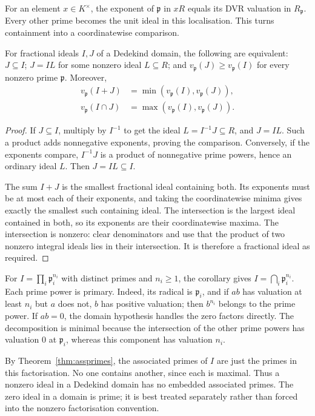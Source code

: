 For an element $x\in K^\times$, the exponent of $\mathfrak p$ in $xR$ equals its DVR valuation in $R_{\mathfrak p}$. Every other prime becomes the unit ideal in this localisation. This turns containment into a coordinatewise comparison.

\begin{corollary}\label{cor:contain}
For fractional ideals $I,J$ of a Dedekind domain, the following are equivalent: $J\subseteq I$; $J=IL$ for some nonzero ideal $L\subseteq R$; and $v_{\mathfrak p}(J)\ge v_{\mathfrak p}(I)$ for every nonzero prime $\mathfrak p$. Moreover,
\[
\begin{split}
 v_{\mathfrak p}(I+J)&=\min(v_{\mathfrak p}(I),v_{\mathfrak p}(J)),\\
 v_{\mathfrak p}(I\cap J)&=\max(v_{\mathfrak p}(I),v_{\mathfrak p}(J)).
\end{split}
\]
\end{corollary}

\begin{proof}
If $J\subseteq I$, multiply by $I^{-1}$ to get the ideal $L=I^{-1}J\subseteq R$, and $J=IL$. Such a product adds nonnegative exponents, proving the comparison. Conversely, if the exponents compare, $I^{-1}J$ is a product of nonnegative prime powers, hence an ordinary ideal $L$. Then $J=IL\subseteq I$.

The sum $I+J$ is the smallest fractional ideal containing both. Its exponents must be at most each of their exponents, and taking the coordinatewise minima gives exactly the smallest such containing ideal. The intersection is the largest ideal contained in both, so its exponents are their coordinatewise maxima. The intersection is nonzero: clear denominators and use that the product of two nonzero integral ideals lies in their intersection. It is therefore a fractional ideal as required.
\end{proof}

For $I=\prod_i\mathfrak p_i^{n_i}$ with distinct primes and $n_i\ge1$, the corollary gives $I=\bigcap_i\mathfrak p_i^{n_i}$. Each prime power is primary. Indeed, its radical is $\mathfrak p_i$, and if $ab$ has valuation at least $n_i$ but $a$ does not, $b$ has positive valuation; then $b^{n_i}$ belongs to the prime power. If $ab=0$, the domain hypothesis handles the zero factors directly. The decomposition is minimal because the intersection of the other prime powers has valuation $0$ at $\mathfrak p_i$, whereas this component has valuation $n_i$.

By Theorem~\ref{thm:assprimes}, the associated primes of $I$ are just the primes in this factorisation. No one contains another, since each is maximal. Thus a nonzero ideal in a Dedekind domain has no embedded associated primes. The zero ideal in a domain is prime; it is best treated separately rather than forced into the nonzero factorisation convention.

